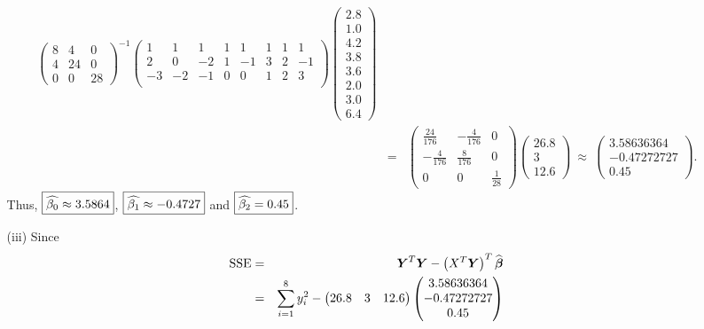 \documentclass[11pt]{article}
\newcommand{\ds}{\displaystyle}
\newcommand{\bs}{\boldsymbol}
\begin{document}
\begin{enumerate}
\begin{enumerate}
\begin{eqnarray*}
\begin{pmatrix}
8 & 4 & 0 \\
4 & 24 & 0 \\
0 & 0 & 28
\end{pmatrix}^{-1}\begin{pmatrix}
1 & 1 & 1 & 1 & 1 & 1 & 1 & 1 \\
2 & 0 & -2 & 1 & -1 & 3 & 2 & -1 \\
-3 & -2 & -1 & 0 & 0 & 1 & 2 & 3 \\
\end{pmatrix}\begin{pmatrix}
2.8 \\
1.0 \\
4.2 \\
3.8 \\
3.6 \\
2.0 \\
3.0 \\
6.4
\end{pmatrix} \\
& = & \begin{pmatrix}
\ds \frac{24}{176} & \ds -\frac{4}{176} & 0 \\
\ds -\frac{4}{176} & \ds \frac{8}{176} & 0 \\
0 & 0 & \ds \frac{1}{28}
\end{pmatrix}\begin{pmatrix}
26.8 \\
3 \\
12.6
\end{pmatrix} \ \approx \ \begin{pmatrix}
3.58636364 \\
-0.47272727 \\
0.45
\end{pmatrix}.
\end{eqnarray*}
Thus, $\fbox{$\widehat{\beta_0} \approx 3.5864$}$, $\fbox{$\widehat{\beta_1} \approx -0.4727$}$ and $\fbox{$\widehat{\beta_2} = 0.45$}$.
\item[(iii)]
Since
\begin{eqnarray*}
{\rm SSE} & = & {\bs Y}^T{\bs Y} - \left(X^T\bs{Y}\right)^T\widehat{\bs{\beta}} \\
& = & \sum_{i=1}^8 y_i^2 - \begin{pmatrix}
26.8 & 3 & 12.6
\end{pmatrix}\begin{pmatrix}
3.58636364 \\
-0.47272727 \\
0.45
\end{pmatrix} \\

\end{eqnarray*}
\end{enumerate}
\end{enumerate}
\end{document}
